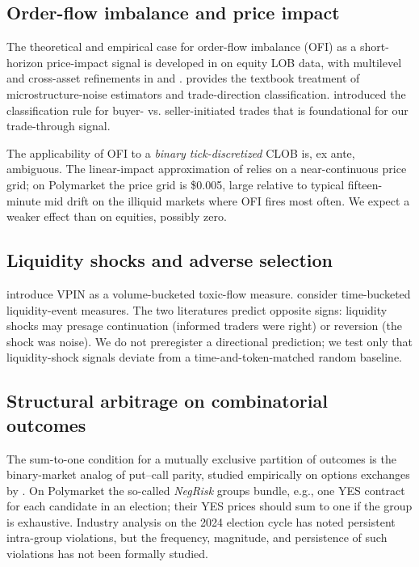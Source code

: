 \documentclass[review,12pt,authoryear]{elsarticle}
\begin{document}
\subsection{Order-flow imbalance and price impact}

The theoretical and empirical case for order-flow imbalance (OFI) as a
short-horizon price-impact signal is developed in
\citet{ContKukanovStoikov2014} on equity LOB data, with multilevel and
cross-asset refinements in \citet{KolmTuretsky2019} and
\citet{LiptonPesavento2014}. \citet{Hasbrouck2007} provides the textbook
treatment of microstructure-noise estimators and trade-direction
classification. \citet{LeeReady1991} introduced the classification rule for
buyer- vs. seller-initiated trades that is foundational for our
trade-through signal.

The applicability of OFI to a \emph{binary tick-discretized} CLOB is, ex
ante, ambiguous. The linear-impact approximation of
\citet{ContKukanovStoikov2014} relies on a near-continuous price grid; on
Polymarket the price grid is \$0.005, large relative to typical
fifteen-minute mid drift on the illiquid markets where OFI fires most often.
We expect a weaker effect than on equities, possibly zero.

\subsection{Liquidity shocks and adverse selection}

\citet{EasleyLopezdePradoOHara2012} introduce VPIN as a volume-bucketed
toxic-flow measure. \citet{NaesSkjeltorp2006} consider time-bucketed
liquidity-event measures. The two literatures predict opposite signs:
liquidity shocks may presage continuation (informed traders were right) or
reversion (the shock was noise). We do not preregister a directional
prediction; we test only that liquidity-shock signals deviate from a
time-and-token-matched random baseline.

\subsection{Structural arbitrage on combinatorial outcomes}

The sum-to-one condition for a mutually exclusive partition of outcomes is
the binary-market analog of put--call parity, studied empirically on options
exchanges by \citet{BattalioSchultz2006}. On Polymarket the so-called
\emph{NegRisk} groups bundle, e.g., one YES contract for each candidate in an
election; their YES prices should sum to one if the group is exhaustive.
Industry analysis on the 2024 election cycle has noted persistent
intra-group violations, but the frequency, magnitude, and persistence of
such violations has not been formally studied.
\end{document}
